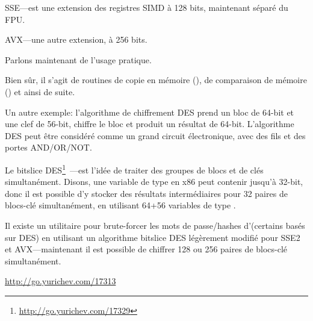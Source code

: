 SSE---est une extension des registres SIMD à 128 bits, maintenant séparé du FPU.

AVX---une autre extension, à 256 bits.

Parlons maintenant de l'usage pratique.

Bien sûr, il s'agit de routines de copie en mémoire (), de comparaison
de mémoire () et ainsi de suite.


Un autre exemple: l'algorithme de chiffrement DES prend un bloc de 64-bit et une
clef de 56-bit, chiffre le bloc et produit un résultat de 64-bit.
L'algorithme DES peut être considéré comme un grand circuit électronique, avec des
fils et des portes AND/OR/NOT.

\label{bitslicedes}
\newcommand{\URLBS}{\url{http://go.yurichev.com/17329}}

Le bitslice DES\footnote{\URLBS}~---est l'idée de traiter des groupes de blocs et
de clés simultanément.
Disons, une variable de type  en x86 peut contenir jusqu'à 32-bit,
donc il est possible d'y stocker des résultats intermédiaires pour 32 paires de blocs-clé
simultanément, en utilisant 64+56 variables de type .

\myindex{\oracle}
Il existe un utilitaire pour brute-forcer les mots de passe/hashes d'\oracle (certains
basés sur DES) en utilisant un algorithme bitslice DES légèrement modifié pour SSE2
et AVX---maintenant il est possible de chiffrer 128 ou 256 paires de blocs-clé simultanément.

\url{http://go.yurichev.com/17313}




